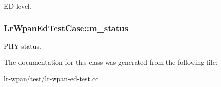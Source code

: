ED level. 

\subsubsection[{\texorpdfstring{m\+\_\+status}{m_status}}]{ Lr\+Wpan\+Ed\+Test\+Case\+::m\+\_\+status\hspace{0.3cm}{\ttfamily [private]}}\hypertarget{classLrWpanEdTestCase_a412f77be5f81e80661cf8e5563e62851}{}\label{classLrWpanEdTestCase_a412f77be5f81e80661cf8e5563e62851}


P\+HY status. 



The documentation for this class was generated from the following file\+:\begin{DoxyCompactItemize}
\item 
lr-\/wpan/test/\hyperlink{lr-wpan-ed-test_8cc}{lr-\/wpan-\/ed-\/test.\+cc}\end{DoxyCompactItemize}

